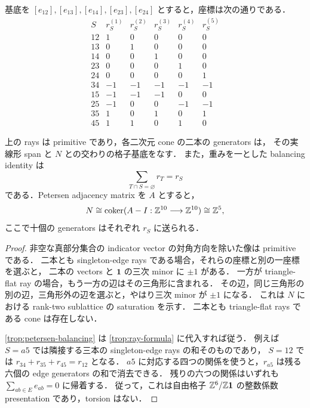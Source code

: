 基底を $[e_{12}],[e_{13}],[e_{14}],[e_{23}],[e_{24}]$ とすると，座標は次の通りである．
\[
\begin{array}{c|rrrrr}
 S&r_S^{(1)}&r_S^{(2)}&r_S^{(3)}&r_S^{(4)}&r_S^{(5)}\\\hline
 12&1&0&0&0&0\\
 13&0&1&0&0&0\\
 14&0&0&1&0&0\\
 23&0&0&0&1&0\\
 24&0&0&0&0&1\\
 34&-1&-1&-1&-1&-1\\
 15&-1&-1&-1&0&0\\
 25&-1&0&0&-1&-1\\
 35&1&0&1&0&1\\
 45&1&1&0&1&0
\end{array}
\]

\begin{proposition}\label{trop:petersen-unimodular}
上の rays は primitive であり，各二次元 cone の二本の generators は，
その実線形 span と $N$ との交わりの格子基底をなす．
また，重みを一とした balancing identity は
\begin{equation}\label{trop:petersen-balancing}
 \sum_{T\cap S=\varnothing}r_T=r_S
\end{equation}
である．Petersen adjacency matrix を $A$ とすると，
\begin{equation}\label{trop:petersen-presentation}
 N\cong\operatorname{coker}(A-I:\mathbb Z^{10}\longrightarrow\mathbb Z^{10})\cong\mathbb Z^5,
\end{equation}
ここで十個の generators はそれぞれ $r_S$ に送られる．
\end{proposition}

\begin{proof}
非空な真部分集合の indicator vector の対角方向を除いた像は primitive である．
二本とも singleton-edge rays である場合，それらの座標と別の一座標を選ぶと，
二本の vectors と $\mathbf1$ の三次 minor に $\pm1$ がある．
一方が triangle-flat ray の場合，もう一方の辺はその三角形に含まれる．
その辺，同じ三角形の別の辺，三角形外の辺を選ぶと，やはり三次 minor が $\pm1$ になる．
これは $N$ における rank-two sublattice の saturation を示す．
二本とも triangle-flat rays である cone は存在しない．

\eqref{trop:petersen-balancing} は \eqref{trop:ray-formula} に代入すれば従う．
例えば $S=a5$ では隣接する三本の singleton-edge rays の和そのものであり，
$S=12$ では $r_{34}+r_{35}+r_{45}=r_{12}$ となる．
$a5$ に対応する四つの関係を使うと，$r_{a5}$ は残る六個の edge generators の和で消去できる．
残りの六つの関係はいずれも $\sum_{ab\in E}e_{ab}=0$ に帰着する．
従って，これは自由格子 $\mathbb Z^6/\mathbb Z\mathbf1$ の整数係数 presentation であり，torsion はない．
\end{proof}

